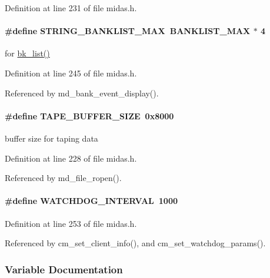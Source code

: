 Definition at line 231 of file midas.h.
\paragraph[{STRING\_\-BANKLIST\_\-MAX}]{\setlength{\rightskip}{0pt plus 5cm}\#define STRING\_\-BANKLIST\_\-MAX~BANKLIST\_\-MAX $\ast$ 4}\hfill\label{group__midasincludecode_gafec0c8869c3f66ea7d186ec4b7682fc0}
for \hyperlink{group__bkfunctionc_ga4d8a0ef23239ae478544fa96a0e98a33}{bk\_\-list()} 

Definition at line 245 of file midas.h.

Referenced by md\_\-bank\_\-event\_\-display().
\paragraph[{TAPE\_\-BUFFER\_\-SIZE}]{\setlength{\rightskip}{0pt plus 5cm}\#define TAPE\_\-BUFFER\_\-SIZE~0x8000}\hfill\label{group__midasincludecode_gab17ef1a258d0569666f69f72ccd50253}
buffer size for taping data 

Definition at line 228 of file midas.h.

Referenced by md\_\-file\_\-ropen().
\paragraph[{WATCHDOG\_\-INTERVAL}]{\setlength{\rightskip}{0pt plus 5cm}\#define WATCHDOG\_\-INTERVAL~1000}\hfill\label{group__midasincludecode_ga92353a0b223e78081b022d5a33870967}


Definition at line 253 of file midas.h.

Referenced by cm\_\-set\_\-client\_\-info(), and cm\_\-set\_\-watchdog\_\-params().

\subsubsection{Variable Documentation}

